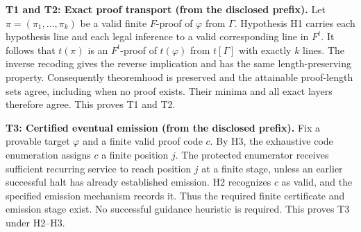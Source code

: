 \medskip\noindent\textbf{T1 and T2: Exact proof transport (from the disclosed prefix).}
Let $\pi=(\pi_1,\ldots,\pi_k)$ be a valid finite $F$-proof of $\varphi$ from $\Gamma$.
Hypothesis H1 carries each hypothesis line and each legal inference to a valid corresponding
line in $F^t$. It follows that $t(\pi)$ is an $F^t$-proof of $t(\varphi)$ from $t[\Gamma]$
with exactly $k$ lines. The inverse recoding gives the reverse implication and has the
same length-preserving property. Consequently theoremhood is preserved and the attainable
proof-length sets agree, including when no proof exists. Their minima and all exact layers
therefore agree. This proves T1 and T2.

\medskip\noindent\textbf{T3: Certified eventual emission (from the disclosed prefix).}
Fix a provable target $\varphi$ and a finite valid proof code $c$. By H3, the exhaustive
code enumeration assigns $c$ a finite position $j$. The protected enumerator receives
sufficient recurring service to reach position $j$ at a finite stage, unless an earlier
successful halt has already established emission. H2 recognizes $c$ as valid, and the
specified emission mechanism records it. Thus the required finite certificate and emission
stage exist. No successful guidance heuristic is required. This proves T3 under H2--H3.

